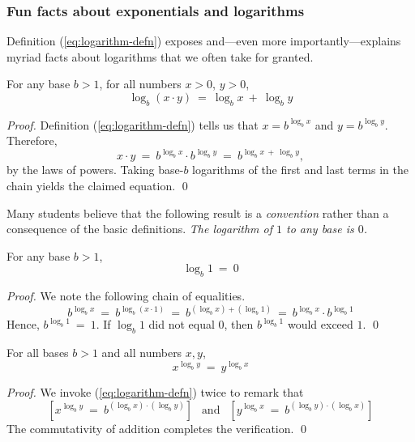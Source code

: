 \subsubsection{Fun facts about exponentials and logarithms}

Definition (\ref{eq:logarithm-defn}) exposes and---even more
importantly---explains myriad facts about logarithms that we often
take for granted.

\begin{prop}
For any base $b >1$, for all numbers $x >0$, $y>0$,
\[ \log_b (x \cdot y) \ = \ \log_b x \ + \ \log_b y \]
\end{prop}

\begin{proof}
Definition (\ref{eq:logarithm-defn}) tells us that $x = b^{\log_b x}$
and $y = b^{\log_b y}$.  Therefore,
\[ x \cdot y \ = \ b^{\log_b x} \cdot b^{\log_b y} \ = \
b^{\log_b x \ + \ \log_b y}, \]
by the laws of powers.  Taking base-$b$ logarithms of the first and
last terms in the chain yields the claimed equation.
\qed
\end{proof}



Many students believe that the following result is a {\em convention}
rather than a consequence of the basic definitions.  {\em The logarithm
  of $1$ to any base is $0$.}

\begin{prop}
For any base $b >1$,
\[ \log_b 1 \ = \ 0 \]
\end{prop}

\begin{proof}
We note the following chain of equalities.
\[  b^{\log_b x} \ = \ b^{\log_b (x \cdot 1)} 
\ = \ b^{(\log_b x) + (\log_b 1)} 
\ = \ b^{\log_b x} \cdot b^{\log_b 1}
\]
Hence, $b^{\log_b 1} \ = \ 1$.  If $\log_b 1$ did not equal $0$, then
$b^{\log_b 1}$ would exceed $1$.  \qed
\end{proof}

\begin{prop}
For all bases $b > 1$ and all numbers $x, y$,
\[ x^{\log_b y} \ = \ y^{\log_b x} \]
\end{prop}

\begin{proof}
We invoke (\ref{eq:logarithm-defn}) twice to remark that
\[ \left[x^{\log_b y} \ = \ b^{(\log_b x) \cdot (\log_b y)}\right]
\ \ \mbox{ and } \ \ 
\left[y^{\log_b x}\ = \ b^{(\log_b y) \cdot (\log_b x)}\right] \]
The commutativity of addition completes the verification.  \qed
\end{proof}

